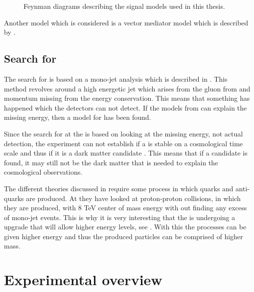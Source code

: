  \begin{figure}[H] %
    \hfill
    \caption{Feynman diagrams describing the signal models used in this thesis.}
    \label{fig:opfeyn}
  \end{figure}
Another model which is considered is a vector mediator model which is described by . 

\subsection{Search for \abbrWIMPS}\label{sec:tb:subsec:WIMPS}
The search for \abbrWIMPS is based on a mono-jet analysis which is described in . This method revolves around a high energetic jet which arises from the gluon from  and momentum missing from the energy conservation. This means that something has happened which the detectors can not detect. If the models from  can explain the missing energy, then a model for \abbrWIMPS has been found. 

Since the search for \abbrWIMPS at the \abbrLHC is based on looking at the missing energy, not actual detection, the experiment can not establish if a \abbrWIMP is stable on a cosmological time scale and thus if it is a dark matter candidate \citep{CERN-PH-EP-2012-210}. This means that if a candidate is found, it may still not be the dark matter that is needed to explain the cosmological observations.

The different theories discussed in  require some process in which quarks and anti-quarks are produced. At \abbrATLAS they have looked at proton-proton collisions, in which they are produced, with 8 TeV center of mass energy with out finding any excess of mono-jet events. This is why it is very interesting that the \abbrLHC is undergoing a upgrade that will allow higher energy levels, see . With this the processes can be given higher energy and thus the produced particles can be comprised of higher mass. 
\newpage
\section{Experimental overview}\label{sec:experiment}
